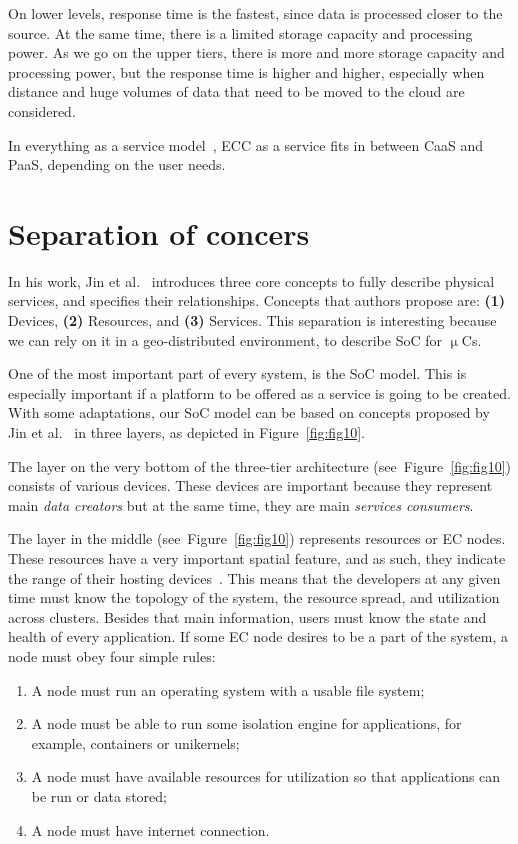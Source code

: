 \noindent
On lower levels, response time is the fastest, since data is processed closer to the source. At the same time, there is a limited storage capacity and processing power. As we go on the upper tiers, there is more and more storage capacity and processing power, but the response time is higher and higher, especially when distance and huge volumes of data that need to be moved to the cloud are considered.

In everything as a service model~\cite{DuanFZSNH15}, ECC as a service fits in between CaaS and PaaS, depending on the user needs. 
%
%
\section{Separation of concers}\label{sec:separation_of_concerns}
%
In his work, Jin et al.~\cite{JinCJL14} introduces three core concepts to fully describe physical services, and specifies their relationships. Concepts that authors propose are: \textbf{(1)} Devices, \textbf{(2)} Resources, and \textbf{(3)} Services. This separation is interesting because we can rely on it in a geo-distributed environment, to describe SoC for $\upmu$Cs.

One of the most important part of every system, is the SoC model. This is especially important if a platform to be offered as a service is going to be created. With some adaptations, our SoC model can be based on concepts proposed by Jin et al.~\cite{JinCJL14} in three layers, as depicted in Figure~\ref{fig:fig10}. 

The layer on the very bottom of the three-tier architecture (see~Figure~\ref{fig:fig10}) consists of various devices. These devices are important because they represent main \textit{data creators} but at the same time, they are main \textit{services consumers}. 

The layer in the middle (see~Figure~\ref{fig:fig10}) represents resources or EC nodes. These resources have a very important spatial feature, and as such, they indicate the range of their hosting devices~\cite{JinCJL14}. This means that the developers at any given time must know the topology of the system, the resource spread, and utilization across clusters. Besides that main information, users must know the state and health of every application\label{soc:resources}. If some EC node desires to be a part of the system, a node must obey four simple rules:

\begin{enumerate}[start=1,label={(\bfseries \arabic*)}]
\item A node must run an operating system with a usable file system;
\item A node must be able to run some isolation engine for applications, for example, containers or unikernels;
\item A node must have available resources for utilization so that applications can be run or data stored;
\item A node must have internet connection.
\end{enumerate}


